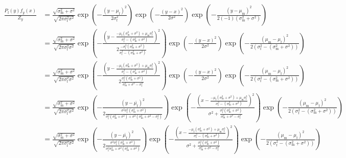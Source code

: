 \documentclass{article}\usepackage[]{graphicx}\usepackage[]{color}
\newcommand{\x}[1]{\text{#1}}
\begin{document}
\begin{landscape}
\begin{align*}
\frac{P_\x{f}(y)f_y(x)}{Z_y}&=\frac{\sqrt{\sigma_\x{m}^2+\sigma^2}}{\sqrt{2\pi\sigma_\x{f}^2\sigma^2}}\exp\left(-\frac{(y-\mu_\x{f})^2}{2\sigma_\x{f}^2}\right)\exp\left(-\frac{(y-x)^2}{2\sigma^2}\right)\exp\left(-\frac{(y-\mu_\x{m})^2}{2(-1)(\sigma_\x{m}^2+\sigma^2)}\right)
\\ &=\frac{\sqrt{\sigma_\x{m}^2+\sigma^2}}{\sqrt{2\pi\sigma_\x{f}^2\sigma^2}}\exp\left(-\frac{\left(y-\frac{-\mu_\x{f}(\sigma_\x{m}^2+\sigma^2)+\mu_\x{m}\sigma_\x{f}^2}{\sigma_\x{f}^2-(\sigma_\x{m}^2+\sigma^2)}\right)^2}{2\frac{-\sigma_\x{f}^2(\sigma_\x{m}^2+\sigma^2)}{\sigma_\x{f}^2-(\sigma_\x{m}^2+\sigma^2)}}\right)\exp\left(-\frac{(y-x)^2}{2\sigma^2}\right)\exp\left(-\frac{(\mu_\x{m}-\mu_\x{f})^2}{2(\sigma_\x{f}^2-(\sigma_\x{m}^2+\sigma^2))}\right)
\\&=\frac{\sqrt{\sigma_\x{m}^2+\sigma^2}}{\sqrt{2\pi\sigma_\x{f}^2\sigma^2}}\exp\left(-\frac{\left(y-\frac{-\mu_\x{f}(\sigma_\x{m}^2+\sigma^2)+\mu_\x{m}\sigma_\x{f}^2}{\sigma_\x{f}^2-(\sigma_\x{m}^2+\sigma^2)}\right)^2}{2\frac{\sigma_\x{f}^2(\sigma_\x{m}^2+\sigma^2)}{\sigma_\x{m}^2+\sigma^2-\sigma_\x{f}^2}}\right)\exp\left(-\frac{(y-x)^2}{2\sigma^2}\right)\exp\left(-\frac{(\mu_\x{m}-\mu_\x{f})^2}{2(\sigma_\x{f}^2-(\sigma_\x{m}^2+\sigma^2))}\right)
\\&=\frac{\sqrt{\sigma_\x{m}^2+\sigma^2}}{\sqrt{2\pi\sigma_\x{f}^2\sigma^2}}\exp\left(-\frac{\left(y-\bar{\mu_\x{f}}\right)^2}{2\frac{\sigma^2\sigma_\x{f}^2(\sigma_\x{m}^2+\sigma^2)}{\sigma_\x{f}^2(\sigma_\x{m}^2+\sigma^2)+\sigma^2(\sigma_\x{m}^2+\sigma^2-\sigma_\x{f}^2)}}\right)\exp\left(-\frac{\left(x-\frac{-\mu_\x{f}(\sigma_\x{m}^2+\sigma^2)+\mu_\x{m}\sigma_\x{f}^2}{\sigma_\x{f}^2-(\sigma_\x{m}^2+\sigma^2)}\right)^2}{\sigma^2+\frac{\sigma_\x{f}^2(\sigma_\x{m}^2+\sigma^2)}{\sigma_\x{m}^2+\sigma^2-\sigma_\x{f}^2}}\right)\exp\left(-\frac{(\mu_\x{m}-\mu_\x{f})^2}{2(\sigma_\x{f}^2-(\sigma_\x{m}^2+\sigma^2))}\right)
\\&=\frac{\sqrt{\sigma_\x{m}^2+\sigma^2}}{\sqrt{2\pi\sigma_\x{f}^2\sigma^2}}\exp\left(-\frac{\left(y-\bar{\mu_\x{f}}\right)^2}{2\frac{\sigma^2\sigma_\x{f}^2(\sigma_\x{m}^2+\sigma^2)}{\sigma_\x{f}^2\sigma_\x{m}^2+\sigma^2(\sigma_\x{m}^2+\sigma^2)}}\right)\exp\left(-\frac{\left(x-\frac{-\mu_\x{f}(\sigma_\x{m}^2+\sigma^2)+\mu_\x{m}\sigma_\x{f}^2}{\sigma_\x{f}^2-(\sigma_\x{m}^2+\sigma^2)}\right)^2}{\sigma^2+\frac{\sigma_\x{f}^2(\sigma_\x{m}^2+\sigma^2)}{\sigma_\x{m}^2+\sigma^2-\sigma_\x{f}^2}}\right)\exp\left(-\frac{(\mu_\x{m}-\mu_\x{f})^2}{2(\sigma_\x{f}^2-(\sigma_\x{m}^2+\sigma^2))}\right)

\end{align*}
\end{landscape}
\end{document}
